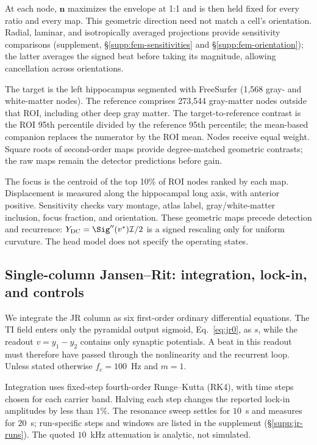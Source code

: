 At each node, $\mathbf n$ maximizes the envelope at 1:1 and is then held fixed
for every ratio and every map. This geometric direction need not match a cell's
orientation. Radial, laminar, and isotropically averaged projections provide
sensitivity comparisons (supplement, \S\ref{supp:fem-sensitivities} and \S\ref{supp:fem-orientation}); the latter averages the signed beat before taking its magnitude,
allowing cancellation across orientations.

The target is the left hippocampus segmented with FreeSurfer (1,568 gray- and
white-matter nodes). The reference comprises 273,544 gray-matter nodes outside
that ROI, including other deep gray matter. The target-to-reference contrast
is the ROI 95th percentile divided by the reference 95th percentile; the
mean-based companion replaces the numerator by the ROI mean. Nodes receive
equal weight. Square roots of second-order maps provide degree-matched geometric
contrasts; the raw maps remain the detector predictions before gain.

The focus is the centroid of the top 10\% of ROI nodes ranked by each map.
Displacement is measured along the hippocampal long axis, with anterior positive.
Sensitivity checks vary montage, atlas label, gray/white-matter inclusion,
focus fraction, and orientation. These geometric maps precede detection and
recurrence: $Y_{\rm DC}=\Sig''(v^*)\mathcal I/2$ is a signed rescaling only
for uniform curvature. The head model does not specify the operating states.

\else
\label{supp:fem-protocol}

\fi

\subsection{Single-column Jansen--Rit: integration, lock-in, and controls}\label{sec:jr-methods}
We integrate the JR column as six first-order ordinary differential equations. The TI field enters only the pyramidal output sigmoid, Eq.~\eqref{eq:jr0},
as $s$, while the readout $v=y_1-y_2$ contains only synaptic potentials.
A beat in this readout must therefore have passed through the nonlinearity
and the recurrent loop. Unless stated otherwise $f_c=100$~Hz and $m=1$.

Integration uses fixed-step fourth-order Runge--Kutta (RK4), with time steps
chosen for each carrier band. Halving each step changes the reported lock-in
amplitudes by less than $1\%$. The resonance sweep settles for $10$~s and measures
for $20$~s; run-specific steps and windows are listed in the supplement
(\S\ref{supp:jr-runs}). The quoted $10$~kHz attenuation is analytic, not simulated.
\ifjne\else

\fi

